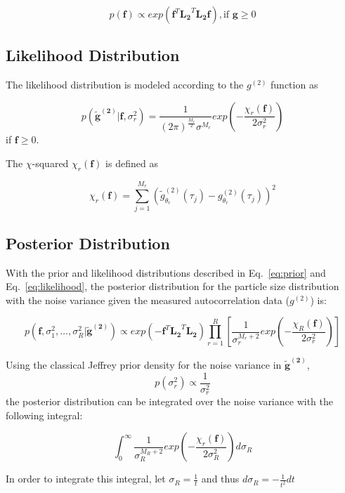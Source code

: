 \documentclass[11pt]{article}
\begin{document}
\begin{equation}\label{eq:prior}
p(\mathbf{f}) \propto exp\left( \mathbf{f}^{T} \mathbf{L_2}^{T}\mathbf{L_2}\mathbf{f} \right), \textrm{if } \mathbf{g} \geq 0
\end{equation}

\subsection{Likelihood Distribution}
The likelihood distribution is modeled according to the $g^{(2)}$ function as 

\begin{equation} \label{eq:likelihood}
p(\mathbf{\tilde{g}^{(2)}} | \mathbf{f}, \sigma^{2}_r ) = \frac{1}{{(2\pi)}^{\frac{M_r}{2}} \sigma^{M_r}}exp\left( -\frac{\chi_r(\mathbf{f})}{2\sigma^2_r}\right)
\end{equation}
if $\mathbf{f} \geq 0$.

The $\chi$-squared $\chi_r(\mathbf{f})$ is defined as 

\begin{equation}
\chi_r(\mathbf{f}) = \sum_{j=1}^{M_r} {\left( \tilde{g}_{\theta_r}^{(2)} (\tau_j) - g_{\theta_r}^{(2)} (\tau_j) \right)}^2
\end{equation}

\subsection{Posterior Distribution}
With the prior and likelihood distributions described in Eq.~\ref{eq:prior} and Eq.~\ref{eq:likelihood}, the posterior distribution for the particle size distribution with the noise variance given the measured autocorrelation data ($g^{(2)}$) is: 

\begin{equation}\label{eq:posterior}
p(\mathbf{f}, \sigma_1^2,\ldots, \sigma_R^2|\mathbf{\tilde{g}^{(2)}}) \propto exp \left( -\mathbf{f}^T\mathbf{L_2}^T\mathbf{L_2} \right) \prod_{r=1}^{R} \left[ \frac{1}{\sigma_r^{M_r+2}} exp \left( -\frac{\chi_R(\mathbf{f})}{2\sigma_r^2} \right) \right]
\end{equation}

Using the classical Jeffrey prior density for the noise variance in $\mathbf{\tilde{g}^{(2)}}$,
\begin{equation}\label{eq:noisevariance}
p(\sigma_r^2) \propto \frac{1}{\sigma_r^2}
\end{equation}
the posterior distribution can be integrated over the noise variance with the following integral:

\begin{equation}
\int_{0}^{\infty} \frac{1}{\sigma_R^{M_R + 2}} exp \left( -\frac{\chi_r(\mathbf{f})}{2\sigma_R^2} \right)d\sigma_R
\end{equation}
 
 In order to integrate this integral, let $\sigma_R = \frac{1}{t}$ and thus $d\sigma_R = -\frac{1}{t^2}dt$
\end{document}
